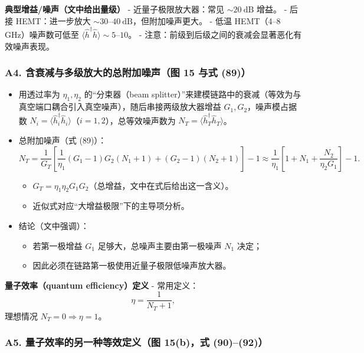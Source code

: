 \documentclass[12pt,a4paper,oneside]{ctexbook}
\providecommand{\tightlist}{%
  \setlength{\itemsep}{0pt}\setlength{\parskip}{0pt}}
\begin{document}
\textbf{典型增益/噪声（文中给出量级）} - 近量子极限放大器：常见
\(\sim 20\ \mathrm{dB}\) 增益。 - 后接 HEMT：进一步放大
\(\sim 30\text{–}40\ \mathrm{dB}\)，但附加噪声更大。 - 低温 HEMT（4--8
GHz）噪声数可低至
\(\langle \hat{h}^\dagger\hat{h}\rangle\sim 5\text{–}10\)。 -
注意：前级到后级之间的衰减会显著恶化有效噪声表现。


\subsubsection{A4. 含衰减与多级放大的总附加噪声（图 15 与式
(89)）}\label{a4.-ux542bux8870ux51cfux4e0eux591aux7ea7ux653eux5927ux7684ux603bux9644ux52a0ux566aux58f0ux56fe-15-ux4e0eux5f0f-89}

\begin{itemize}
\tightlist
\item
  用透过率为 \(\eta_1,\eta_2\) 的``分束器（beam
  splitter）''来建模链路中的衰减（等效为与真空端口耦合引入真空噪声），随后串接两级放大器增益
  \(G_1,G_2\)，噪声模占据数
  \(N_i=\langle \hat{h}_i^\dagger\hat{h}_i\rangle\)（\(i=1,2\)），总等效噪声数为
  \(N_T=\langle \hat{h}_T^\dagger\hat{h}_T\rangle\)。
\item
  总附加噪声（式 (89)）： \[
  N_T=\frac{1}{G_T}\left[
  \frac{1}{\eta_1}(G_1-1)G_2(N_1+1)+(G_2-1)(N_2+1)
  \right]-1
  \approx \frac{1}{\eta_1}\left[1+N_1+\frac{N_2}{\eta_2G_1}\right]-1 .
  \]

  \begin{itemize}
  \tightlist
  \item
    \(G_T=\eta_1\eta_2G_1G_2\)（总增益，文中在式后给出这一含义）。
  \item
    近似式对应``大增益极限''下的主导项分析。
  \end{itemize}
\item
  结论（文中强调）：

  \begin{itemize}
  \tightlist
  \item
    若第一极增益 \(G_1\) 足够大，总噪声主要由第一极噪声 \(N_1\) 决定；
  \item
    因此必须在链路第一极使用近量子极限低噪声放大器。
  \end{itemize}
\end{itemize}

\textbf{量子效率（quantum efficiency）定义} - 常用定义： \[
  \eta=\frac{1}{N_T+1},
  \] 理想情况 \(N_T=0 \Rightarrow \eta=1\)。


\subsubsection{A5. 量子效率的另一种等效定义（图 15(b)，式
(90)--(92)）}\label{a5.-ux91cfux5b50ux6548ux7387ux7684ux53e6ux4e00ux79cdux7b49ux6548ux5b9aux4e49ux56fe-15bux5f0f-9092}
\end{document}
